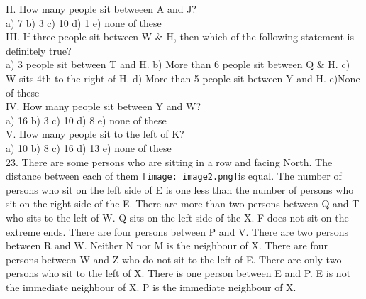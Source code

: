 \documentclass[
]{article}
\begin{document}
II. How many people sit betweeen A and J?\\
a) 7 \hspace{2mm}b) 3 \hspace{2mm}c) 10 \hspace{2mm}d) 1 \hspace{2mm}e) none of these\\

III. If three people sit between W \& H, then which of the following statement is
definitely true?\\
a) 3 people sit between T and H. \hspace{2mm}b) More than 6 people sit between Q \& H.
\hspace{2mm}c) W sits 4th to the right of H. d) More than 5 people sit between Y and H.
\hspace{2mm}e)None of these\\

IV. How many people sit between Y and W?\\
a) 16 \hspace{2mm}b) 3 \hspace{2mm}c) 10 \hspace{2mm}d) 8 \hspace{2mm}e) none of these\\

V. How many people sit to the left of K?\\
a) 10 \hspace{2mm}b) 8 \hspace{2mm}c) 16 \hspace{2mm}d) 13 \hspace{2mm}e) none of these\\

23. There are some persons who are sitting in a row and facing North. The distance between
each of them \texttt{[image: image2.png]}is equal. The number of persons who sit on the left side of E is one less than the
number of persons who sit on the right side of the E. There are more than two persons
between Q and T who sits to the left of W. Q sits on the left side of the X. F does not sit on
the extreme ends. There are four persons between P and V. There are two persons between
R and W. Neither N nor M is the neighbour of X. There are four persons between W and Z
who do not sit to the left of E. There are only two persons who sit to the left of X. There is
one person between E and P. E is not the immediate neighbour of X. P is the immediate
neighbour of X.\\
\end{document}
